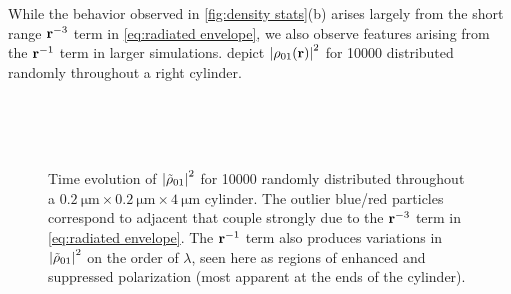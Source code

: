 While the behavior observed in \cref{fig:density stats}(b) arises largely from the short range $\vb{r}^{-3}$ term in \cref{eq:radiated envelope}, we also observe features arising from the $\vb{r}^{-1}$ term in larger simulations.
 depict $\abs{\rho_{01}(\vb{r})}^2$ for \num{10000} \qds{} distributed randomly throughout a right cylinder.


\begin{figure}
  \centering
   \\
   \\
   \\
  \caption{\label{fig:tubes}
    Time evolution of $\abs{\tilde{\rho}_{01}}^2$ for \num{10000} \qds{} randomly distributed throughout a $\SI{0.2}{\micro\meter} \times \SI{0.2}{\micro\meter} \times \SI{4}{\micro\meter}$ cylinder.
    The outlier blue/red particles correspond to adjacent \qds{} that couple strongly due to the $\vb{r}^{-3}$ term in \cref{eq:radiated envelope}.
    The $\vb{r}^{-1}$ term also produces variations in $\abs{\tilde{\rho}_{01}}^2$ on the order of $\lambda$, seen here as regions of enhanced and suppressed polarization (most apparent at the ends of the cylinder).
  }
\end{figure}

